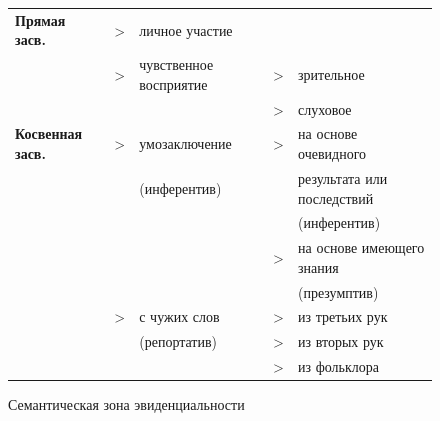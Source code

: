 
\begin{figure}[H]
\centering
\caption{Семантическая зона эвиденциальности}
\vspace{0.5cm}
\label{tab:evsem}
\begin{tabular}{lllll}
\textbf{Прямая засв.}    & \textgreater{} & личное участие         &                &                            \\
                         & \textgreater{} & чувственное восприятие & \textgreater{} & зрительное                 \\
                         &                &                        & \textgreater{} & слуховое                   \\
\textbf{Косвенная засв.} & \textgreater{} & умозаключение          & \textgreater{} & на основе очевидного       \\
\textbf{}                &                & (инферентив)           &                & результата или последствий \\
                         &                &                        &                & (инферентив)               \\
                         &                &                        & \textgreater{} & на основе имеющего знания  \\
                         &                &                        &                & (презумптив)               \\
                         & \textgreater{} & с чужих слов           & \textgreater{} & из третьих рук            \\
                         &                & (репортатив)           & \textgreater{} & из вторых рук             \\
                         &                &                        & \textgreater{} & из фольклора              
\end{tabular}
\end{figure}

